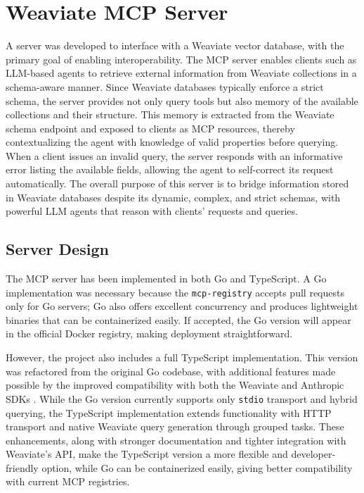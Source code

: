 \section{Weaviate MCP Server}\label{sec:weaviate-mcp-server}
A  server was developed to interface with a Weaviate vector database, with the primary goal of enabling interoperability. The MCP server enables clients such as \gls{LLM}-based agents to retrieve external information from Weaviate collections in a schema-aware manner. Since Weaviate databases typically enforce a strict schema, the server provides not only query tools but also memory of the available collections and their structure. This memory is extracted from the Weaviate schema endpoint and exposed to clients as MCP resources, thereby contextualizing the agent with knowledge of valid properties before querying. When a client issues an invalid query, the server responds with an informative error listing the available fields, allowing the agent to self-correct its request automatically. The overall purpose of this server is to bridge information stored in Weaviate databases despite its dynamic, complex, and strict schemas, with powerful \gls{LLM} agents that reason with clients' requests and queries.

\subsection{Server Design}

The MCP server has been implemented in both Go and TypeScript. A Go implementation was necessary because the \texttt{mcp-registry} accepts pull requests only for Go servers; Go also offers excellent concurrency and produces lightweight binaries that can be containerized easily. If accepted, the Go version will appear in the official Docker registry, making deployment straightforward.

However, the project also includes a full TypeScript implementation. This version was refactored from the original Go codebase, with additional features made possible by the improved compatibility with both the Weaviate and Anthropic SDKs \cite{stainless_mcp_comparison}. While the Go version currently supports only \texttt{stdio} transport and hybrid querying, the TypeScript implementation extends functionality with HTTP transport and native Weaviate query generation through grouped tasks. These enhancements, along with stronger documentation and tighter integration with Weaviate’s API, make the TypeScript version a more flexible and developer-friendly option, while Go can be containerized easily, giving better compatibility with current \gls{MCP} registries.
